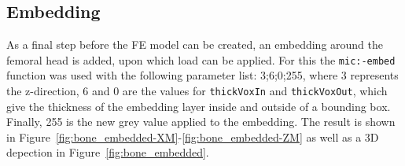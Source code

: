 \documentclass[a4paper,12pt]{article}
\begin{document}
    \subsection{Embedding}\label{subsec:embedding}
    As a final step before the FE model can be created, an embedding around the femoral head is added, upon which load can be applied.
    For this the \texttt{mic:-embed} function was used with the following parameter list: 3;6;0;255, where 3 represents the z-direction, 6 and 0 are the values for \texttt{thickVoxIn} and \texttt{thickVoxOut}, which give the thickness of the embedding layer inside and outside of a bounding box.
    Finally, 255 is the new grey value applied to the embedding.
    The result is shown in Figure~\ref{fig:bone_embedded-XM}-\ref{fig:bone_embedded-ZM} as well as a 3D depection in Figure~\ref{fig:bone_embedded}.
\end{document}
